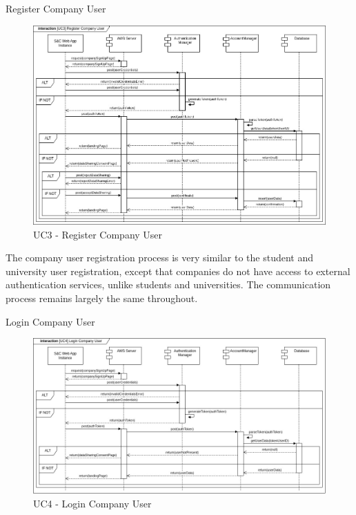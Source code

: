 \begin{enumerate}[label={[UC\arabic*]}]
    \item Register Company User
    \begin{figure}[h]
        \centering
        \includegraphics[width=1\linewidth]{DD-Latex//assets//Runtime View Diagrams/UC3.jpg}
        \caption{UC3 - Register Company User}
        \label{fig:UC3}
    \end{figure}
    
    The company user registration process is very similar to the student and university user registration, except that companies do not have access to external authentication services, unlike students and universities. The communication process remains largely the same throughout.

    \newpage
    \item Login Company User
    \begin{figure}[h]
        \centering
        \includegraphics[width=1\linewidth]{DD-Latex//assets//Runtime View Diagrams/UC4.jpg}
        \caption{UC4 - Login Company User}
        \label{fig:UC4}
    \end{figure}
    

\end{enumerate}

